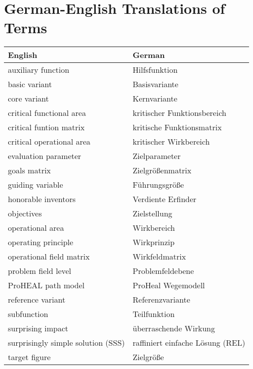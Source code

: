 \documentclass[11pt,a4paper]{article}
\begin{document}
\section{German-English Translations of Terms}
\begin{center}
  \begin{tabular}{l|l}
    English & German \\\hline
    auxiliary function & Hilfsfunktion \\
    basic variant & Basisvariante\\
    core variant & Kernvariante\\
    critical functional area & kritischer Funktionsbereich\\
    critical funtion matrix & kritische Funktionsmatrix\\
    critical operational area & kritischer Wirkbereich\\
    evaluation parameter & Zielparameter\\
    goals matrix& Zielgrößenmatrix \\
    guiding variable & Führungsgröße \\
    honorable inventors & Verdiente Erfinder\\
    objectives & Zielstellung \\
    operational area & Wirkbereich\\
    operating principle & Wirkprinzip\\
    operational field matrix & Wirkfeldmatrix\\
    problem field level & Problemfeldebene \\
    ProHEAL path model & ProHeal Wegemodell\\
    reference variant & Referenzvariante\\
    subfunction & Teilfunktion\\
    surprising impact & überraschende Wirkung \\
    surprisingly simple solution (SSS) & raffiniert einfache Lösung (REL)\\
    target figure & Zielgröße\\ 
  \end{tabular}
\end{center}
\end{document}
